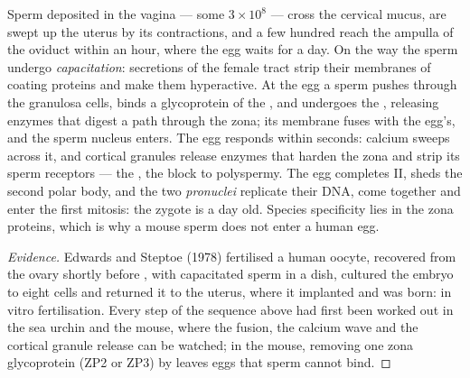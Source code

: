 \begin{proposition}\label{prop:b2:mammal-reproduction:fertilisation}
Sperm deposited in the vagina --- some $3\times 10^{8}$ --- cross the
cervical mucus, are swept up the uterus by its contractions, and a
few hundred reach the ampulla of the oviduct within an hour, where
the egg waits for a day. On the way the sperm undergo
\emph{capacitation}: secretions of the female tract strip their
membranes of coating proteins and make them hyperactive. At the egg
a sperm pushes through the granulosa cells, binds a glycoprotein of
the \emph{}, and undergoes the \emph{}, releasing enzymes that digest a path through the zona;
its membrane fuses with the egg's, and the sperm nucleus enters. The
egg responds within seconds: calcium sweeps across it, and cortical
granules release enzymes that harden the zona and strip its sperm
receptors --- the \emph{}, the block to polyspermy.
The egg completes  II, sheds the second polar body, and the
two  \emph{pronuclei} replicate their DNA, come together and
enter the first mitosis: the zygote is a day old. Species
specificity lies in the zona proteins, which is why a mouse sperm
does not enter a human egg.
\end{proposition}
\begin{proof}[Evidence]
Edwards and Steptoe (1978) fertilised a human oocyte, recovered
from the ovary shortly before , with capacitated sperm in
a dish, cultured the embryo to eight cells and returned it to the
uterus, where it implanted and was born: in vitro fertilisation.
Every step of the sequence above had first been worked out in the
sea urchin and the mouse, where the fusion, the calcium wave and the
cortical granule release can be watched; in the mouse, removing one
zona glycoprotein (ZP2 or ZP3) by  leaves eggs that sperm
cannot bind.
\end{proof}

